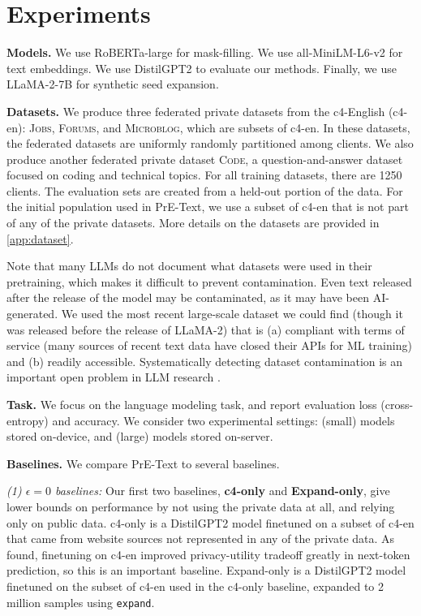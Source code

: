\section{Experiments}
\label{sec:exp results}

\textbf{Models.}  We use RoBERTa-large \citep{roberta} for mask-filling.  We use all-MiniLM-L6-v2 for text embeddings.  We use DistilGPT2 \citep{sanh2019distilbert} to evaluate our methods. 
Finally, we use LLaMA-2-7B \citep{touvron2023llama} for synthetic seed expansion.

\textbf{Datasets.} We produce three federated private datasets from the c4-English \citep{c4} (c4-en): \textsc{Jobs}, \textsc{Forums}, and \textsc{Microblog}, which are subsets of c4-en. In these datasets, the federated datasets are uniformly randomly partitioned among clients. We also produce another federated private dataset \textsc{Code}, a question-and-answer dataset focused on coding and technical topics. For all training datasets, there are 1250 clients. The evaluation sets are created from a held-out portion of the data. For the initial population used in PrE-Text, we use a subset of c4-en that is not part of any of the private datasets. More details on the datasets are provided in \cref{app:dataset}. 

Note that many LLMs do not document what datasets were used in their pretraining, which makes it difficult to prevent contamination. Even text released after the release of the model may be contaminated, as it may have been AI-generated. We used the most recent large-scale dataset we could find (though it was released before the release of LLaMA-2) that is (a) compliant with terms of service (many sources of recent text data have closed their APIs for ML training) and (b) readily accessible. Systematically detecting dataset contamination is an important open problem in LLM research \citep{gunasekar2023textbooks}. 

\textbf{Task.} We focus on the language modeling task, and report evaluation loss (cross-entropy) and accuracy. We consider two experimental settings: (small) models stored on-device, and (large) models stored on-server.

\textbf{Baselines.} We compare PrE-Text to several baselines.

\textit{(1) $\epsilon=0$ baselines:} Our first two baselines, \textbf{c4-only} and \textbf{Expand-only}, give lower bounds on performance by not using the private data at all, and relying only on public data. 
c4-only is a DistilGPT2 model finetuned on a subset of c4-en that came from website sources not represented in any of the private data. As \citet{xu2023federated} found, finetuning on c4-en improved privacy-utility tradeoff greatly in next-token prediction, so this is an important baseline. Expand-only is a DistilGPT2 model finetuned on the subset of c4-en used in the c4-only baseline, expanded to 2 million samples using \texttt{expand}. 

